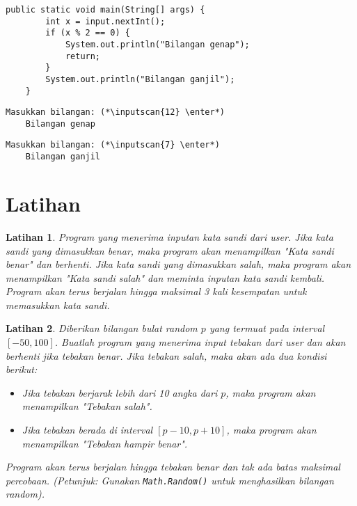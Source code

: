 \documentclass[aspectratio=169]{beamer}
\newtheorem{latihan}{Latihan}
\theoremstyle{definition}
\newcommand{\enter}{\raisebox{-1.8pt}{\begin{tikzpicture}[scale=0.3]
    \draw[thin,fill=gray] (0,0) rectangle (2,1);
    \draw (0.3,0.3) -- (0.7,0.3)--(0.7,0.6);     
\end{tikzpicture}}}
\newcommand{\inputscan}[1]{\raisebox{0pt}[1pt]{\colorbox{darkgray}{#1}}}
\begin{document}
    \begin{frame}[fragile]
        \frametitle{\insertsection}
        \begin{lstlisting}[firstnumber=3,caption={Contoh penggunaan \texttt{return}}]
    public static void main(String[] args) {
        int x = input.nextInt();
        if (x % 2 == 0) {
            System.out.println("Bilangan genap");
            return;
        }
        System.out.println("Bilangan ganjil");
    }
        \end{lstlisting}
        \begin{lstlisting}[style=output]
    Masukkan bilangan: (*\inputscan{12} \enter*)
    Bilangan genap
        \end{lstlisting}
        \begin{lstlisting}[style=output]
    Masukkan bilangan: (*\inputscan{7} \enter*)
    Bilangan ganjil
        \end{lstlisting}
    \end{frame}

    \section{Latihan}
    \begin{frame}
        \begin{latihan}
            Program yang menerima inputan kata sandi dari user. Jika kata sandi yang dimasukkan benar, maka program akan menampilkan "Kata sandi benar" dan berhenti. Jika kata sandi yang dimasukkan salah, maka program akan menampilkan "Kata sandi salah" dan meminta inputan kata sandi kembali. Program akan terus berjalan hingga maksimal 3 kali kesempatan untuk memasukkan kata sandi.
        \end{latihan}
    \end{frame}

    \begin{frame}
        \begin{latihan}
            Diberikan bilangan bulat random $p$ yang termuat pada interval $[-50,100]$. Buatlah program yang menerima input tebakan dari user dan akan berhenti jika tebakan benar. Jika tebakan salah, maka akan ada dua kondisi berikut:
            \begin{itemize}[label=$\triangleright$]
                \item Jika tebakan berjarak lebih dari 10 angka dari $p$, maka program akan menampilkan "Tebakan salah".
                \item Jika tebakan berada di interval $[p-10,p+10]$, maka program akan menampilkan "Tebakan hampir benar".
            \end{itemize}
            Program akan terus berjalan hingga tebakan benar dan tak ada batas maksimal percobaan. (Petunjuk: Gunakan \texttt{Math.Random()} untuk menghasilkan bilangan random).
        \end{latihan}
    \end{frame}
        
\end{document}
